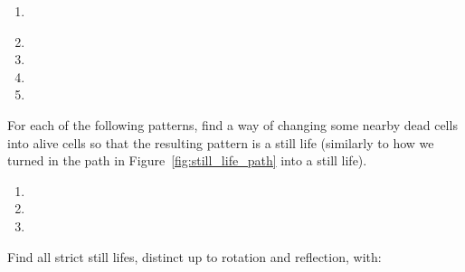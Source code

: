 \begin{multicols}{2}
\begin{problemstar}
\begin{multicols}{2}
\begin{enumerate}[label=(\alph*),series=exer_pseudo]
				\item[\bf\color{ocre}(c)] \\[1.0em]
				
				\item[\bf\color{ocre}(e)] 
				
				\item[\bf\color{ocre}(b)] 
				
				\item[\bf\color{ocre}(d)] 
				
				\item[\bf\color{ocre}(f)] 
			\end{enumerate}
		\end{multicols}
	\end{problemstar}
	
	
	\mfilbreak
	
	
	\begin{problemstar}\label{exer:still_life_add_dead}
		For each of the following patterns, find a way of changing some nearby dead cells into alive cells so that the resulting pattern is a still life (similarly to how we turned in the path in Figure~\ref{fig:still_life_path} into a still life).\vspace*{-0.25cm}
		
		\begin{multicols}{2}
			\begin{enumerate}
				\item[\bf\color{ocre}(a)] 
				
				\item[\bf\color{ocre}(c)] 
				
				\item[\bf\color{ocre}(b)] 
			\end{enumerate}
		\end{multicols}
	\end{problemstar}
	
	
	\mfilbreak
	
	
	\begin{problem}\label{exer:small_strict_still_lifes}
		Find all strict still lifes, distinct up to rotation and reflection, with:\smallskip
		

\end{problem}
\end{multicols}

